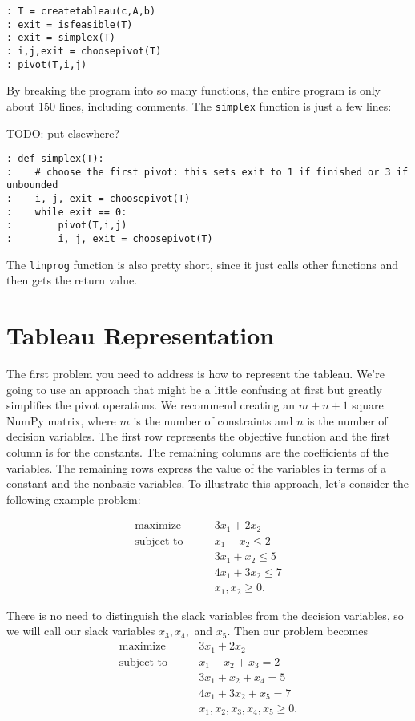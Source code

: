 \begin{lstlisting}[style=python]
: T = createtableau(c,A,b)
: exit = isfeasible(T)
: exit = simplex(T)
: i,j,exit = choosepivot(T)
: pivot(T,i,j)
\end{lstlisting}

By breaking the program into so many functions, the entire program is only about 150 lines, including comments.
The {\tt simplex} function is just a few lines:

TODO: put elsewhere?

\begin{lstlisting}[style=python]
: def simplex(T):
:    # choose the first pivot: this sets exit to 1 if finished or 3 if unbounded
:    i, j, exit = choosepivot(T)
:    while exit == 0:
:        pivot(T,i,j)
:        i, j, exit = choosepivot(T)
\end{lstlisting}
The {\tt linprog} function is also pretty short, since it just calls other functions and then gets the return value.

\section*{Tableau Representation}

The first problem you need to address is how to represent the tableau.
We're going to use an approach that might be a little confusing at first but greatly simplifies the pivot operations.
We recommend creating an $m + n + 1$ square NumPy matrix, where $m$ is the number of constraints and $n$ is the number of decision variables.
The first row represents the objective function and the first column is for the constants.
The remaining columns are the coefficients of the variables.
The remaining rows express the value of the variables in terms of a constant and the nonbasic variables.
To illustrate this approach, let's consider the following example problem:

\begin{align*}
	\mbox{maximize}\qquad
        &    3x_1 + 2x_2 \\
	\mbox{subject to}\qquad
        &     x_1 - x_2 \leq 2 \\
		&	 3x_1 + x_2 \leq 5 \\
		&	 4x_1 + 3x_2 \leq 7 \\
		&     x_1, x_2 \geq 0.
\end{align*}

There is no need to distinguish the slack variables from the decision variables, so we will call our slack variables $x_3, x_4,$ and $x_5$.
Then our problem becomes
\begin{align*}
	\mbox{maximize}\qquad
        &    3x_1 + 2x_2 \\
	\mbox{subject to}\qquad
        &     x_1 - x_2 + x_3 = 2 \\
		&	 3x_1 + x_2 + x_4 = 5 \\
		&	 4x_1 + 3x_2 + x_5 = 7 \\
		&     x_1, x_2, x_3, x_4, x_5 \geq 0.
\end{align*}


